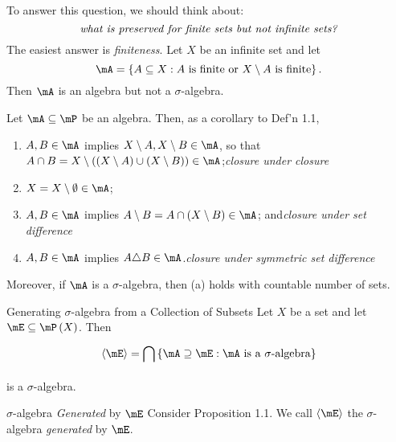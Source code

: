 \documentclass[pmath451]{subfiles}
\begin{document}
    \begin{answer}
        To answer this question, we should think about:
        \begin{equation*}
            \text{\textit{what is preserved for finite sets but not infinite sets?}}
        \end{equation*}
        The easiest answer is \textit{finiteness}. Let $X$ be an infinite set and let
        \begin{equation*}
            \mA = \left\lbrace A\subseteq X: A\text{ is finite or } X\setminus A\text{ is finite} \right\rbrace.
        \end{equation*}
        Then $\mA$ is an algebra but not a $\sigma$-algebra.
    \end{answer}
    
    \np Let $\mA\subseteq\mP$ be an algebra. Then, as a corollary to Def'n 1.1,
    \begin{enumerate}
        \item $A,B\in\mA$ implies $X\setminus A, X\setminus B\in\mA$, so that $A\cap B = X\setminus \left( \left( X\setminus A \right)\cup \left( X\setminus B \right) \right)\in\mA$;\hfill\textit{closure under closure}
        \item $X = X\setminus\emptyset\in\mA$;
        \item $A,B\in\mA$ implies $A\setminus B = A\cap\left( X\setminus B \right) \in\mA$; and\hfill\textit{closure under set difference}
        \item $A,B\in\mA$ implies $A\triangle B\in\mA$.\hfill\textit{closure under symmetric set difference}
    \end{enumerate}
    Moreover, if $\mA$ is a $\sigma$-algebra, then (a) holds with countable number of sets.
    
    \begin{prop}{Generating $\sigma$-algebra from a Collection of Subsets}
        Let $X$ be a set and let $\mE\subseteq\mP\left( X \right)$. Then
        \begin{equation*}
            \left< \mE \right> = \bigcap^{}_{} \left\lbrace \mA\supseteq\mE: \text{$\mA$ is a $\sigma$-algebra} \right\rbrace 
        \end{equation*}
        is a $\sigma$-algebra.
    \end{prop}

    \placeqed[Exercise]

    \begin{definition}{$\sigma$-algebra \emph{Generated} by $\mE$}
        Consider Proposition 1.1. We call $\left< \mE \right>$ the $\sigma$-algebra \emph{generated} by $\mE$. 
    \end{definition}
\end{document}
